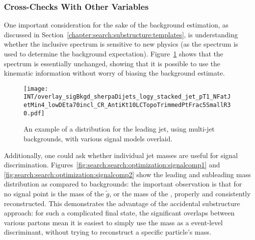 \subsubsection{Cross-Checks With Other Variables}

One important consideration for the sake of the background estimation, as discussed in Section~\ref{chapter:search:substructure:templates}, is understanding whether the inclusive \pt spectrum is sensitive to new physics (as the \pt spectrum is used to determine the background expectation). Figure~\ref{fig:search:search:optimization:pt} shows that the \pt spectrum is essentially unchanged, showing that it is possible to use the kinematic information without worry of biasing the background estimate.


\begin{figure}
\centering
\texttt{[image: INT/overlay\_sigBkgd\_sherpaDijets\_logy\_stacked\_jet\_pT1\_NFatJetMin4\_lowDEta70incl\_CR\_AntiKt10LCTopoTrimmedPtFrac5SmallR30.pdf]}
\caption{An example of a \pt distribution for the leading jet, using \Sherpa multi-jet backgrounds, with various signal models overlaid.}
\label{fig:search:search:optimization:pt}
\end{figure}



Additionally, one could ask whether individual jet masses are useful for signal discrimination. Figures~\ref{fig:search:search:optimization:signalcomp1} and \ref{fig:search:search:optimization:signalcomp2} show the leading and subleading mass distribution as compared to \Herwigpp backgrounds: the important observation is that for no signal point is the mass of the $\tilde{g}$, or the mass of the \lsp, properly and consistently reconstructed. This demonstrates the advantage of the accidental substructure approach: for such a complicated final state, the significant overlaps between various partons mean it is easiest to simply use the mass as a event-level discriminant, without trying to reconstruct a specific particle's mass.



